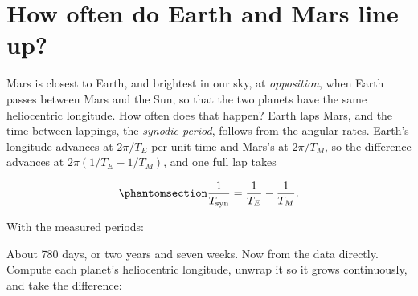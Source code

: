 \documentclass[
  10.5pt,
  letterpaper,
]{scrbook}
\newenvironment{Shaded}{\begin{snugshade}}{\end{snugshade}}
\newcommand{\CommentTok}[1]{\textcolor[rgb]{0.00,0.00,0.00}{\textit{#1}}}
\newcommand{\DecValTok}[1]{\textcolor[rgb]{0.00,0.00,0.00}{#1}}
\newcommand{\NormalTok}[1]{\textcolor[rgb]{0.00,0.00,0.00}{#1}}
\newcommand{\OtherTok}[1]{\textcolor[rgb]{0.00,0.00,0.00}{#1}}
\newcommand{\SpecialCharTok}[1]{\textcolor[rgb]{0.00,0.00,0.00}{#1}}
\newcommand{\StringTok}[1]{\textcolor[rgb]{0.00,0.00,0.00}{#1}}
\theoremstyle{plain}
\theoremstyle{remark}
\begin{document}
\section{How often do Earth and Mars line
up?}\label{how-often-do-earth-and-mars-line-up}

Mars is closest to Earth, and brightest in our sky, at
\emph{opposition}, when Earth passes between Mars and the Sun, so that
the two planets have the same heliocentric longitude. How often does
that happen? Earth laps Mars, and the time between lappings, the
\emph{synodic period}, follows from the angular rates. Earth's longitude
advances at \(2\pi/T_E\) per unit time and Mars's at \(2\pi/T_M\), so
the difference advances at \(2\pi(1/T_E - 1/T_M)\), and one full lap
takes

\begin{equation}\protect\phantomsection\label{eq-synodic}{
\frac{1}{T_{\mathrm{syn}}} = \frac{1}{T_E} - \frac{1}{T_M}.
}\end{equation}

With the measured periods:

\begin{Shaded}
\end{Shaded}

About 780 days, or two years and seven weeks. Now from the data
directly. Compute each planet's heliocentric longitude, unwrap it so it
grows continuously, and take the difference:
\end{document}
